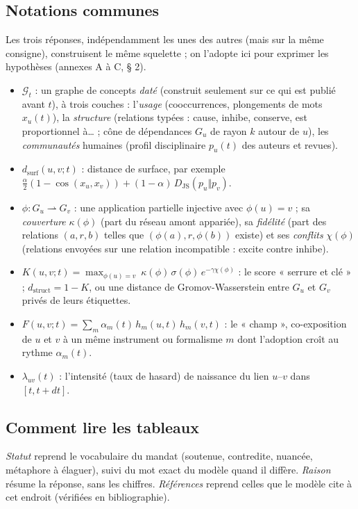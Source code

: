 \documentclass[a4paper,11pt]{article}
\begin{document}
\subsection*{Notations communes}
Les trois réponses, indépendamment les unes des autres (mais sur la même consigne), construisent le même squelette ; on l'adopte ici pour exprimer les hypothèses (annexes A à C, § 2).
\begin{itemize}[itemsep=1pt]
\item $\mathcal{G}_t$ : un graphe de concepts \emph{daté} (construit seulement sur ce qui est publié avant $t$), à trois couches : l'\emph{usage} (cooccurrences, plongements de mots $x_u(t)$), la \emph{structure} (relations typées : cause, inhibe, conserve, est proportionnel à… ; cône de dépendances $G_u$ de rayon $k$ autour de $u$), les \emph{communautés} humaines (profil disciplinaire $p_u(t)$ des auteurs et revues).
\item $d_{\text{surf}}(u,v;t)$ : distance de surface, par exemple $\tfrac{\alpha}{2}(1-\cos(x_u,x_v)) + (1-\alpha)\,D_{\mathrm{JS}}(p_u\Vert p_v)$.
\item $\phi : G_u \rightharpoonup G_v$ : une application partielle injective avec $\phi(u)=v$ ; sa \emph{couverture} $\kappa(\phi)$ (part du réseau amont appariée), sa \emph{fidélité} (part des relations $(a,r,b)$ telles que $(\phi(a),r,\phi(b))$ existe) et ses \emph{conflits} $\chi(\phi)$ (relations envoyées sur une relation incompatible : excite contre inhibe).
\item $K(u,v;t)=\max_{\phi(u)=v}\ \kappa(\phi)\,\sigma(\phi)\,e^{-\gamma\chi(\phi)}$ : le score « serrure et clé » ; $d_{\text{struct}} = 1-K$, ou une distance de Gromov-Wasserstein entre $G_u$ et $G_v$ privés de leurs étiquettes.
\item $F(u,v;t)=\sum_m \alpha_m(t)\,h_m(u,t)\,h_m(v,t)$ : le « champ », co-exposition de $u$ et $v$ à un même instrument ou formalisme $m$ dont l'adoption croît au rythme $\alpha_m(t)$.
\item $\lambda_{uv}(t)$ : l'intensité (taux de hasard) de naissance du lien $u$–$v$ dans $[t,t+dt]$.
\end{itemize}

\subsection*{Comment lire les tableaux}
\emph{Statut} reprend le vocabulaire du mandat (soutenue, contredite, nuancée, métaphore à élaguer), suivi du mot exact du modèle quand il diffère. \emph{Raison} résume la réponse, sans les chiffres. \emph{Références} reprend celles que le modèle cite à cet endroit (vérifiées en bibliographie).
\end{document}
